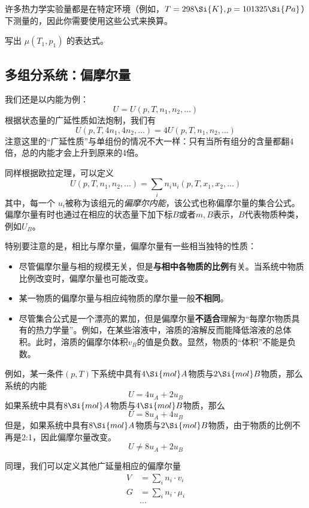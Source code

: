 许多热力学实验量都是在特定环境（例如，$T = 298 \Si{K}, p = 101325\Si{Pa}$）下测量的，因此你需要使用这些公式来换算。

\begin{exercise}{}
写出 $\mu(T_1,p_1)$ 的表达式。
\end{exercise}

\subsection{多组分系统：偏摩尔量}
我们还是以内能为例：
$$U = U (p, T, n_1, n_2, ...)$$
根据状态量的广延性质如法炮制，我们有
$$ U (p, T, 4n_1, 4n_2, ...) = 4U (p, T, n_1, n_2, ...)$$
注意这里的“广延性质”与单组份的情况不大一样：只有当所有组分的含量都翻4倍，总的内能才会上升到原来的4倍。

同样根据欧拉定理，可以定义
$$ U (p, T, n_1, n_2, ...) = \sum_i n_i u_i(p, T, x_1, x_2, ...) $$
其中，每一个 $u_i$被称为该组元的\textsl{偏摩尔内能}，该公式也称偏摩尔量的集合公式。偏摩尔量有时也通过在相应的状态量下加下标$B$或者$m,B$表示，$B$代表物质种类，例如$U_B$。

特别要注意的是，相比与摩尔量，偏摩尔量有一些相当独特的性质：
\begin{itemize}
\item 尽管偏摩尔量与相的规模无关，但是\textbf{与相中各物质的比例}有关。当系统中物质比例改变时，偏摩尔量也可能改变。
\item 某一物质的偏摩尔量与相应纯物质的摩尔量一般\textbf{不相同}。
\item 尽管集合公式是一个漂亮的累加，但是偏摩尔量\textbf{不适合}理解为“每摩尔物质具有的热力学量”。例如，在某些溶液中，溶质的溶解反而能降低溶液的总体积。此时，溶质的偏摩尔体积$v_B$的值是负数。显然，物质的“体积”不能是负数。
\end{itemize}

\begin{example}{}
例如，某一条件$(p,T)$下系统中具有$4 \Si{mol} A$物质与$2 \Si{mol} B$物质，那么系统的内能
$$U = 4 u_{A} +  2 u_B $$
如果系统中具有$8 \Si{mol} A$物质与$4 \Si{mol} B$物质，那么
$$U = 8 u_A +  4 u_B$$
但是，如果系统中具有$8 \Si{mol} A$物质与$2 \Si{mol} B$物质，由于物质的比例不再是2:1，因此偏摩尔量改变。
$$U \ne 8 u_A +  2 u_B$$
\end{example}

同理，我们可以定义其他广延量相应的偏摩尔量
$$
\begin{aligned}
V &= \sum_i  n_i \cdot v_i \\
G &= \sum_i  n_i \cdot \mu_i \\
&...\\
\end{aligned}
$$


